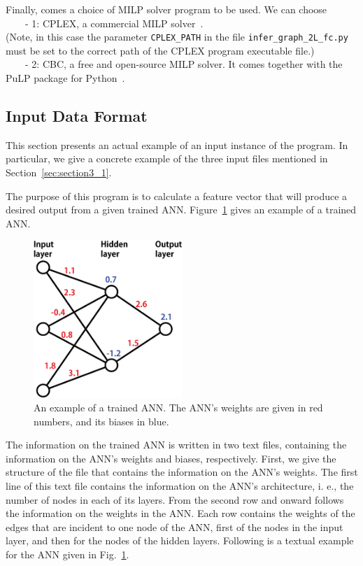 \documentclass[11pt, titlepage, dvipdfmx, twoside]{article}
\begin{document}
Finally, comes a choice of MILP solver program to be used.
We can choose \\
~~~~- 1: CPLEX, a commercial MILP solver~\cite{cplex}. \\
(Note, in this case the parameter {\tt CPLEX\_PATH} in the file {\tt infer\_graph\_2L\_fc.py}
must be set to the correct path of the CPLEX program executable file.) \\
~~~~- 2: CBC, a free and open-source MILP solver. 
It comes together with the PuLP package for Python~\cite{PuLP1}.




\subsection{Input Data Format}
\label{sec:section3_2}

This section presents an actual example of an input instance of the program.
In particular, we give a concrete example of the three input files
mentioned in Section~\ref{sec:section3_1}.

The purpose of this program is to calculate a feature vector that will produce a desired output from a 
given trained ANN.
Figure~\ref{fig:sample} gives an example of a trained ANN.


\begin{figure}[H]
  \centering
  \includegraphics[width=0.5\textwidth]{./fig/ANN_sample_en}
  \caption{An example of a trained ANN.
		      The ANN's weights are given in red numbers, and
		      its biases in blue.
		    }
  \label{fig:sample}
\end{figure}


The information on the trained ANN is written in two text files, containing the information
on the ANN's weights and biases, respectively.
First, we give the structure of the file that contains the information on the ANN's weights.
The first line of this text file contains the information on the ANN's architecture, i. e., 
the number of nodes in each of its layers.
From the second row and onward
follows the information on the 
weights in the ANN.
Each row contains the weights of the edges that are incident to one node of the ANN,
first of the nodes in the input layer, and then for the nodes of the hidden layers.
Following is a textual example for the ANN given in Fig.~\ref{fig:sample}.
\end{document}

